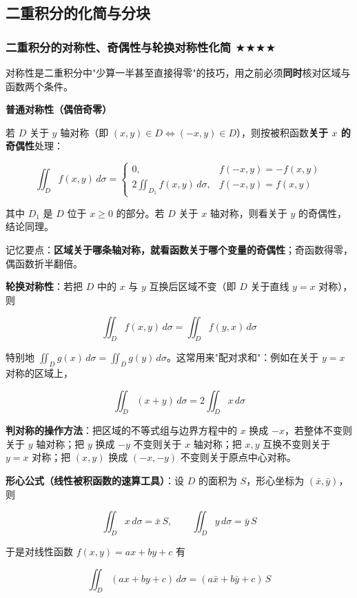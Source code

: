 \documentclass[11pt,openany,UTF8]{ctexbook}
\begin{document}
\subsection{二重积分的化简与分块}

\subsubsection{二重积分的对称性、奇偶性与轮换对称性化简 $\bigstar$$\bigstar$$\bigstar$$\bigstar$}

对称性是二重积分中"少算一半甚至直接得零"的技巧，用之前必须\textbf{同时}核对区域与函数两个条件。

\textbf{普通对称性（偶倍奇零）}

若 $D$ 关于 $y$ 轴对称（即 $(x,y)\in D\Leftrightarrow(-x,y)\in D$），则按被积函数\textbf{关于 $x$ 的奇偶性}处理：

\[\iint_{D}f(x,y)\,d\sigma=\begin{cases}0, & f(-x,y)=-f(x,y)\\[4pt] 2\displaystyle\iint_{D_1}f(x,y)\,d\sigma, & f(-x,y)=f(x,y)\end{cases}\]

其中 $D_1$ 是 $D$ 位于 $x\ge 0$ 的部分。若 $D$ 关于 $x$ 轴对称，则看关于 $y$ 的奇偶性，结论同理。

记忆要点：\textbf{区域关于哪条轴对称，就看函数关于哪个变量的奇偶性}；奇函数得零，偶函数折半翻倍。

\textbf{轮换对称性}：若把 $D$ 中的 $x$ 与 $y$ 互换后区域不变（即 $D$ 关于直线 $y=x$ 对称），则

\[\iint_{D}f(x,y)\,d\sigma=\iint_{D}f(y,x)\,d\sigma\]

特别地 $\iint_{D}g(x)\,d\sigma=\iint_{D}g(y)\,d\sigma$。这常用来"配对求和"：例如在关于 $y=x$ 对称的区域上，

\[\iint_{D}(x+y)\,d\sigma=2\iint_{D}x\,d\sigma\]

\textbf{判对称的操作方法}：把区域的不等式组与边界方程中的 $x$ 换成 $-x$，若整体不变则关于 $y$ 轴对称；把 $y$ 换成 $-y$ 不变则关于 $x$ 轴对称；把 $x,y$ 互换不变则关于 $y=x$ 对称；把 $(x,y)$ 换成 $(-x,-y)$ 不变则关于原点中心对称。

\textbf{形心公式（线性被积函数的速算工具）}：设 $D$ 的面积为 $S$，形心坐标为 $(\bar x,\bar y)$，则

\[\iint_{D}x\,d\sigma=\bar x\,S,\qquad \iint_{D}y\,d\sigma=\bar y\,S\]

于是对线性函数 $f(x,y)=ax+by+c$ 有

\[\iint_{D}(ax+by+c)\,d\sigma=(a\bar x+b\bar y+c)\,S\]
\end{document}
